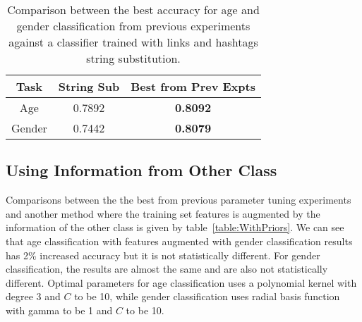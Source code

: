 \documentclass[a4paper]{llncs}
\begin{document}
\begin{table}[!htbp]
\centering
\begin{tabular}{|c|cc|}
\hline
Task   & String Sub & Best from Prev Expts \\ \hline
Age    & 0.7892     & \textbf{0.8092}               \\ %
Gender & 0.7442     & \textbf{0.8079}               \\ \hline
\end{tabular}
\caption{Comparison between the best accuracy for age and gender classification from previous experiments against a classifier trained with links and hashtags string substitution.}
\label{table:StringSub}
\end{table}




\subsection{Using Information from Other Class}
Comparisons between the the best from previous parameter tuning experiments and another method where the training set features is augmented by the information of the other class is given by table~\ref{table:WithPriors}. We can see that age classification with features augmented with gender classification results has 2\% increased accuracy but it is not statistically different. For gender classification, the results are almost the same and are also not statistically different. Optimal parameters for age classification uses a polynomial kernel with degree 3 and $C$ to be 10, while gender classification uses radial basis function with gamma to be 1 and $C$ to be 10.
\end{document}
